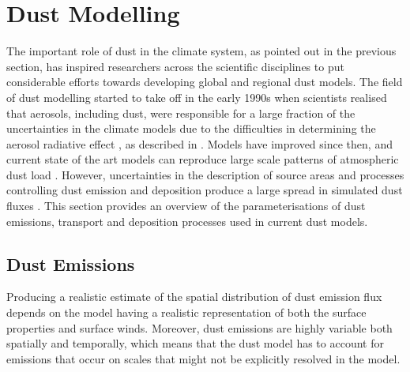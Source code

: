 \section{Dust Modelling}\label{sec:dust_modelling}
The important role of dust in the climate system, as pointed out in the previous section, has inspired researchers across the scientific disciplines to put considerable efforts towards developing global and regional dust models. 
The field of dust modelling started to take off in the early 1990s when scientists realised that aerosols, including dust, were responsible for a large fraction of the uncertainties in the climate models due to the difficulties in determining the aerosol radiative effect \parencite{tegen1996influence}, as described in . 
Models have improved since then, and current state of the art models can reproduce large scale patterns of atmospheric dust load \parencite{huneeus2011global}. 
However, uncertainties in the description of source areas and processes controlling dust emission and deposition produce a large spread in simulated dust fluxes \parencite{huneeus2011global}. 
This section provides an overview of the parameterisations of dust emissions, transport and deposition processes used in current dust models. 
 
\subsection{Dust Emissions}\label{sec:dust_emission_modelling}
Producing a realistic estimate of the spatial distribution of dust emission flux depends on the model having a realistic representation of both the surface properties and surface winds. Moreover, dust emissions are highly variable both spatially and temporally, which means that the dust model has to account for emissions that occur on scales that might not be explicitly resolved in the model.        

